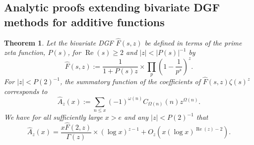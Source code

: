 \documentclass[11pt,reqno,a4letter]{article}
\numberwithin{figure}{section}
\numberwithin{table}{section}
\theoremstyle{plain}
\newtheorem{theorem}{Theorem}
\numberwithin{theorem}{section}
\theoremstyle{definition}
\renewcommand{\Re}{\operatorname{Re}}
\begin{document}
\subsection{Analytic proofs extending bivariate DGF methods for additive functions} 

\begin{theorem} 
\label{prop_HatAzx_ModSummatoryFuncExps_RelatedToCkn} 
Let the bivariate DGF $\widehat{F}(s, z)$ be defined in terms of the prime zeta function, $P(s)$,  
for $\Re(s) \geq 2$ and $|z| < |P(s)|^{-1}$ by 
\[
\widehat{F}(s, z) := \frac{1}{1+P(s) z} 
     \times \prod_p \left(1 - \frac{1}{p^s}\right)^{z}. 
\]
For $|z| < P(2)^{-1}$, the 
summatory function of the coefficients of 
$\widehat{F}(s, z) \zeta(s)^{z}$ corresponds to 
\[
\widehat{A}_z(x) := \sum_{n \leq x} (-1)^{\omega(n)} 
     C_{\Omega(n)}(n) z^{\Omega(n)}. 
\]
We have for all sufficiently large $x > e$ and any $|z|< P(2)^{-1}$ that
\[
\widehat{A}_z(x) = \frac{x \widehat{F}(2, z)}{\Gamma(z)} \times (\log x)^{z-1} + 
     O_{z}\left(x (\log x)^{\Re(z) - 2}\right). 
\]
\end{theorem} 
\end{document}
